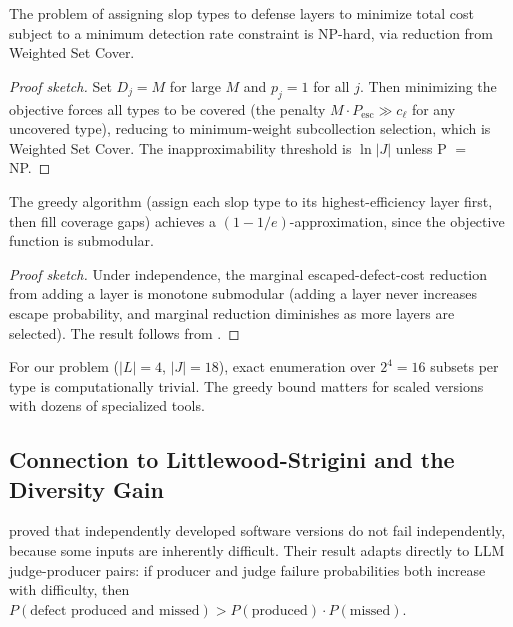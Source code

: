 \begin{theorem}
\label{thm:defense-nphard}
The problem of assigning slop types to defense layers to minimize total cost subject to a minimum detection rate constraint is NP-hard, via reduction from Weighted Set Cover.
\end{theorem}

\begin{proof}[Proof sketch]
Set $D_j = M$ for large $M$ and $p_j = 1$ for all $j$. Then minimizing the objective forces all types to be covered (the penalty $M \cdot P_{\mathrm{esc}} \gg c_\ell$ for any uncovered type), reducing to minimum-weight subcollection selection, which is Weighted Set Cover. The inapproximability threshold is $\ln |J|$ unless P $=$ NP.
\end{proof}

\begin{proposition}
\label{prop:greedy-defense}
The greedy algorithm (assign each slop type to its highest-efficiency layer first, then fill coverage gaps) achieves a $(1-1/e)$-approximation, since the objective function is submodular.
\end{proposition}

\begin{proof}[Proof sketch]
Under independence, the marginal escaped-defect-cost reduction from adding a layer is monotone submodular (adding a layer never increases escape probability, and marginal reduction diminishes as more layers are selected). The result follows from \citet{nemhauser1978}.
\end{proof}

\begin{remark}
For our problem ($|L| = 4$, $|J| = 18$), exact enumeration over $2^4 = 16$ subsets per type is computationally trivial. The greedy bound matters for scaled versions with dozens of specialized tools.
\end{remark}

\subsection{Connection to Littlewood-Strigini and the Diversity Gain}

\citet{littlewood1993, littlewood2000} proved that independently developed software versions do not fail independently, because some inputs are inherently difficult. Their result adapts directly to LLM judge-producer pairs: if producer and judge failure probabilities both increase with difficulty, then $P(\text{defect produced and missed}) > P(\text{produced}) \cdot P(\text{missed})$.

